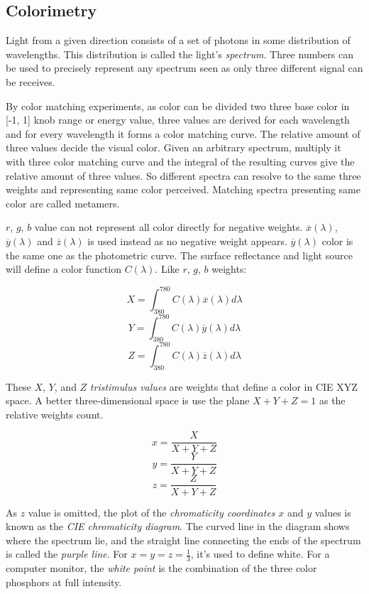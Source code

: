 \documentclass[10pt, a4paper]{article}
\begin{document}
    \subsection{Colorimetry}
        Light from a given direction consists of a set of photons in some distribution of wavelengths. This distribution is called the light's \emph{spectrum}. Three numbers can be used to precisely represent any spectrum seen as only three different signal can be receives. 

        By color matching experiments, as color can be divided two three base color in [-1, 1] knob range or energy value, three values are derived for each wavelength and for every wavelength it forms a color matching curve. The relative amount of three values decide the visual color. Given an arbitrary spectrum, multiply it with three color matching curve and the integral of the resulting curves give the relative amount of three values. So different spectra can resolve to the same three weights and representing same color perceived. Matching spectra presenting same color are called metamers. 

        $r$, $g$, $b$ value can not represent all color directly for negative weights. $\overline{x}(\lambda )$, $\overline{y}(\lambda)$ and $\overline{z}(\lambda)$ is used instead as no negative weight appears. $\overline{y}(\lambda)$ color is the same one as the photometric curve. The surface reflectance and light source will define a color function $C(\lambda)$. Like $r$, $g$, $b$ weights: 
        
        $$X = \int_{380}^{780}C(\lambda)\overline{x}(\lambda)d\lambda$$
        $$Y = \int_{380}^{780}C(\lambda)\overline{y}(\lambda)d\lambda$$
        $$Z = \int_{380}^{780}C(\lambda)\overline{z}(\lambda)d\lambda$$

        These $X$, $Y$, and $Z$ \emph{tristimulus values} are weights that define a color in CIE XYZ space. A better three-dimensional space is use the plane $X + Y +Z = 1$ as the relative weights count. 

        $$x = \frac{X}{X + Y + Z}$$
        $$y = \frac{Y}{X + Y + Z}$$
        $$z = \frac{Z}{X + Y + Z}$$

        As $z$ value is omitted, the plot of the \emph{chromaticity coordinates} $x$ and $y$ values is known as the \emph{CIE chromaticity diagram}. The curved line in the diagram shows where the spectrum lie, and the straight line connecting the ends of the spectrum is called the \emph{purple line}. For $x = y = z = \frac{1}{3}$, it's used to define white. For a computer monitor, the \emph{white point} is the combination of the three color phosphors at full intensity. 
\end{document}
